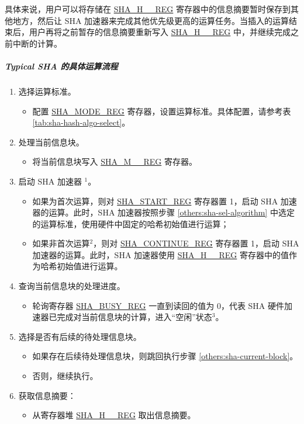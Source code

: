 \documentclass[main\_\_CN.tex]{subfiles}
\begin{document}
具体来说，用户可以将存储在 \hyperref[regdesc:SHAHNREG]{SHA\_H\_\_REG} 寄存器中的信息摘要暂时保存到其他地方，然后让 SHA 加速器来完成其他优先级更高的运算任务。当插入的运算结束后，用户再将之前暂存的信息摘要重新写入 \hyperref[regdesc:SHAHNREG]{SHA\_H\_\_REG} 中，并继续完成之前中断的计算。

\subparagraph{Typical SHA 的具体运算流程}

\begin{enumerate}
    \item \label{others:sha-sel-algorithm} 选择运算标准。
    \begin{itemize}
        \item 配置 \hyperref[regdesc:SHAMODEREG]{SHA\_MODE\_REG} 寄存器，设置运算标准。具体配置，请参考表 \ref{tab:sha-hash-algo-select}。
    \end{itemize}
    \item \label{others:sha-current-block} 处理当前信息块。
    \begin{itemize}
        \item 将当前信息块写入 \hyperref[regdesc:SHAMNREG]{SHA\_M\_\_REG} 寄存器。
    \end{itemize}
    \item 启动 SHA 加速器 \hyperref[others:sha-note-typical-sha]{$^1$}。
            \begin{itemize}
                \item 如果为首次运算，则对 \hyperref[regdesc:SHASTARTREG]{SHA\_START\_REG} 寄存器置 1，启动 SHA 加速器的运算。此时，SHA 加速器按照步骤 \ref{others:sha-sel-algorithm} 中选定的运算标准，使用硬件中固定的哈希初始值进行运算；
                \item 如果非首次运算\hyperref[others:sha-note-typical-sha]{$^2$}，则对 \hyperref[regdesc:SHACONTINUEREG]{SHA\_CONTINUE\_REG} 寄存器置 1，启动 SHA 加速器的运算。此时，SHA 加速器使用 \hyperref[regdesc:SHAHNREG]{SHA\_H\_\_REG} 寄存器中的值作为哈希初始值进行运算。
            \end{itemize}
    \item 查询当前信息块的处理进度。
    \begin{itemize}
        \item 轮询寄存器 \hyperref[regdesc:SHABUSYREG]{SHA\_BUSY\_REG} 一直到读回的值为 0，代表 SHA 硬件加速器已完成对当前信息块的计算，进入“空闲”状态\hyperref[others:sha-note-typical-sha]{$^3$}。
    \end{itemize}
        
    \item 选择是否有后续的待处理信息块。
    \begin{itemize}
        \item 如果存在后续待处理信息块，则跳回执行步骤 \ref{others:sha-current-block}。
        \item 否则，继续执行。
    \end{itemize}
    \item 获取信息摘要：
    \begin{itemize}
        \item 从寄存器堆 \hyperref[regdesc:SHAHNREG]{SHA\_H\_\_REG} 取出信息摘要。
    \end{itemize}
\end{enumerate}
\end{document}
